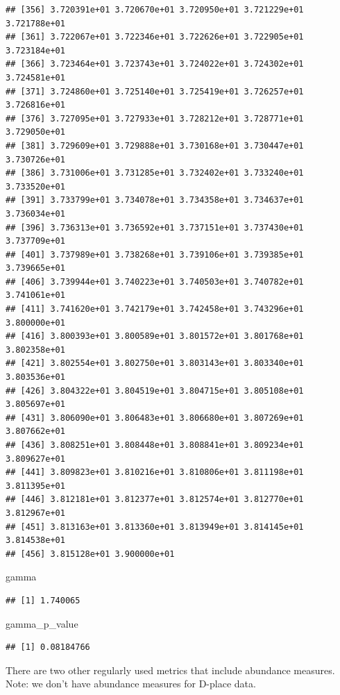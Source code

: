 \documentclass[]{book}
\newenvironment{Shaded}{\begin{snugshade}}{\end{snugshade}}
\newcommand{\NormalTok}[1]{{#1}}
\theoremstyle{definition}
\theoremstyle{definition}
\theoremstyle{definition}
\theoremstyle{remark}
\begin{document}
\begin{verbatim}
## [356] 3.720391e+01 3.720670e+01 3.720950e+01 3.721229e+01 3.721788e+01
## [361] 3.722067e+01 3.722346e+01 3.722626e+01 3.722905e+01 3.723184e+01
## [366] 3.723464e+01 3.723743e+01 3.724022e+01 3.724302e+01 3.724581e+01
## [371] 3.724860e+01 3.725140e+01 3.725419e+01 3.726257e+01 3.726816e+01
## [376] 3.727095e+01 3.727933e+01 3.728212e+01 3.728771e+01 3.729050e+01
## [381] 3.729609e+01 3.729888e+01 3.730168e+01 3.730447e+01 3.730726e+01
## [386] 3.731006e+01 3.731285e+01 3.732402e+01 3.733240e+01 3.733520e+01
## [391] 3.733799e+01 3.734078e+01 3.734358e+01 3.734637e+01 3.736034e+01
## [396] 3.736313e+01 3.736592e+01 3.737151e+01 3.737430e+01 3.737709e+01
## [401] 3.737989e+01 3.738268e+01 3.739106e+01 3.739385e+01 3.739665e+01
## [406] 3.739944e+01 3.740223e+01 3.740503e+01 3.740782e+01 3.741061e+01
## [411] 3.741620e+01 3.742179e+01 3.742458e+01 3.743296e+01 3.800000e+01
## [416] 3.800393e+01 3.800589e+01 3.801572e+01 3.801768e+01 3.802358e+01
## [421] 3.802554e+01 3.802750e+01 3.803143e+01 3.803340e+01 3.803536e+01
## [426] 3.804322e+01 3.804519e+01 3.804715e+01 3.805108e+01 3.805697e+01
## [431] 3.806090e+01 3.806483e+01 3.806680e+01 3.807269e+01 3.807662e+01
## [436] 3.808251e+01 3.808448e+01 3.808841e+01 3.809234e+01 3.809627e+01
## [441] 3.809823e+01 3.810216e+01 3.810806e+01 3.811198e+01 3.811395e+01
## [446] 3.812181e+01 3.812377e+01 3.812574e+01 3.812770e+01 3.812967e+01
## [451] 3.813163e+01 3.813360e+01 3.813949e+01 3.814145e+01 3.814538e+01
## [456] 3.815128e+01 3.900000e+01
\end{verbatim}

\begin{Shaded}
\begin{Highlighting}[]
\NormalTok{gamma }
\end{Highlighting}
\end{Shaded}

\begin{verbatim}
## [1] 1.740065
\end{verbatim}

\begin{Shaded}
\begin{Highlighting}[]
\NormalTok{gamma_p_value }
\end{Highlighting}
\end{Shaded}

\begin{verbatim}
## [1] 0.08184766
\end{verbatim}

There are two other regularly used metrics that include abundance
measures. Note: we don't have abundance measures for D-place data.
\end{document}
